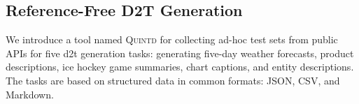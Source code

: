 \documentclass[12pt,notitlepage,a4paper,oneside,openany]{report}
\newcommand*{\datatool}{\textsc{Quintd}}
\begin{document}


\subsection{Reference-Free D2T Generation}
\label{sec:quintd:data}

We introduce a tool named \datatool{} for collecting ad-hoc test sets from public APIs for five \ac{d2t} generation tasks: generating five-day weather forecasts, product descriptions, ice hockey game summaries, chart captions, and entity descriptions. The tasks are based on structured data in common formats: JSON, CSV, and Markdown.
\end{document}
